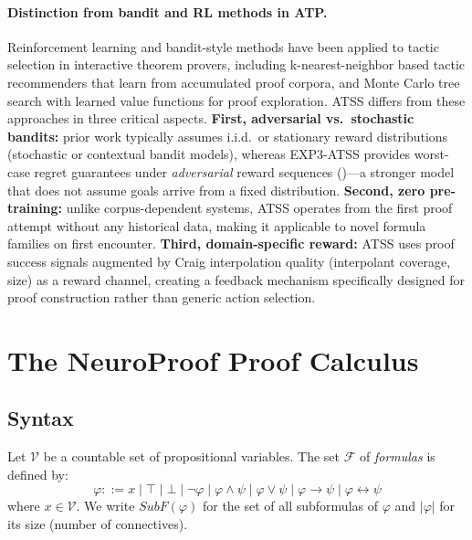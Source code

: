 \documentclass[conference]{IEEEtran}
\newcommand{\dland}{\mathbin{\wedge}}
\newcommand{\dlor}{\mathbin{\vee}}
\newcommand{\dlnot}{\neg}
\newcommand{\dlimp}{\mathbin{\to}}
\newcommand{\dliff}{\mathbin{\leftrightarrow}}
\newcommand{\dlbot}{\bot}
\newcommand{\dltop}{\top}
\newcommand{\Fml}{\mathcal{F}}
\newcommand{\ATSS}{\textsc{ATSS}}
\begin{document}
\paragraph{Distinction from bandit and RL methods in ATP.}
Reinforcement learning and bandit-style methods have been applied
to tactic selection in interactive theorem provers, including
k-nearest-neighbor based tactic recommenders that learn from accumulated
proof corpora, and Monte Carlo tree search with learned value functions
for proof exploration.  \ATSS{} differs from these approaches in three
critical aspects.  \textbf{First, adversarial vs.~stochastic bandits:}
prior work typically assumes i.i.d.~or stationary reward distributions
(stochastic or contextual bandit models), whereas EXP3-ATSS provides
worst-case regret guarantees under \emph{adversarial} reward sequences
()---a stronger model that does not assume goals
arrive from a fixed distribution.  \textbf{Second, zero pre-training:}
unlike corpus-dependent systems, \ATSS{} operates from the first proof
attempt without any historical data, making it applicable to novel
formula families on first encounter.  \textbf{Third, domain-specific
reward:} \ATSS{} uses proof success signals augmented by Craig
interpolation quality (interpolant coverage, size) as a reward
channel, creating a feedback mechanism specifically designed for
proof construction rather than generic action selection.

\section{The NeuroProof Proof Calculus}
\label{sec:system}

\subsection{Syntax}

Let $\mathcal{V}$ be a countable set of propositional variables.
The set $\Fml$ of \emph{formulas} is defined by:
\begin{equation}
  \varphi ::= x \mid \dltop \mid \dlbot \mid \dlnot\varphi
    \mid \varphi \dland \psi \mid \varphi \dlor \psi
    \mid \varphi \dlimp \psi \mid \varphi \dliff \psi
\end{equation}
where $x \in \mathcal{V}$.
We write $\mathit{SubF}(\varphi)$ for the set of all subformulas
of $\varphi$ and $|\varphi|$ for its size (number of connectives).
\end{document}
